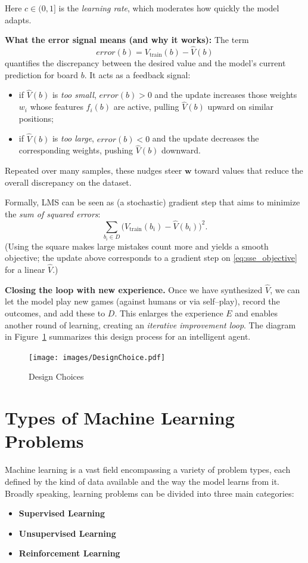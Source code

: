 \documentclass[10pt, letterpaper]{report}
\begin{document}
Here $c\in(0,1]$ is the \emph{learning rate}, which moderates how quickly the model adapts.

\bigskip
\textbf{What the error signal means (and why it works):}
The term
\[
	error(b)=V_{\text{train}}(b)-\hat V(b)
\]
quantifies the discrepancy between the desired value and the model’s current prediction for board $b$. It acts as a feedback signal:
\begin{itemize}
	\item if $\hat V(b)$ is \emph{too small}, $error(b)>0$ and the update increases those weights $w_i$ whose features $f_i(b)$ are active, pulling $\hat V(b)$ upward on similar positions;
	\item if $\hat V(b)$ is \emph{too large}, $error(b)<0$ and the update decreases the corresponding weights, pushing $\hat V(b)$ downward.
\end{itemize}
Repeated over many samples, these nudges steer $\mathbf w$ toward values that reduce the overall discrepancy on the dataset.

Formally, LMS can be seen as (a stochastic) gradient step that aims to minimize the \emph{sum of squared errors}:
\begin{equation}
	\label{eq:sse_objective}
	\sum_{b_i\in D} \bigl( V_{\text{train}}(b_i)-\hat V(b_i)\bigr)^2.
\end{equation}
(Using the square makes large mistakes count more and yields a smooth objective; the update above corresponds to a gradient step on \eqref{eq:sse_objective} for a linear $\hat V$.)

\bigskip
\textbf{Closing the loop with new experience.}
Once we have synthesized $\hat V$, we can let the model play new games (against humans or via self–play), record the outcomes, and add these to $D$. This enlarges the experience $E$ and enables another round of learning, creating an \emph{iterative improvement loop}. The diagram in Figure~\ref{img:DesignChoice} summarizes this design process for an intelligent agent.

\bigskip
\begin{figure}[h!]
	\centering
	\texttt{[image: images/DesignChoice.pdf]}
	\caption{Design Choices}
	\label{img:DesignChoice}
\end{figure}

\newpage
\section{Types of Machine Learning Problems}

Machine learning is a vast field encompassing a variety of problem types, each defined by the kind of data available and the way the model learns from it.
Broadly speaking, learning problems can be divided into three main categories:
\begin{itemize}
	\item \textbf{Supervised Learning}
	\item \textbf{Unsupervised Learning}
	\item \textbf{Reinforcement Learning}
\end{itemize}
\end{document}
